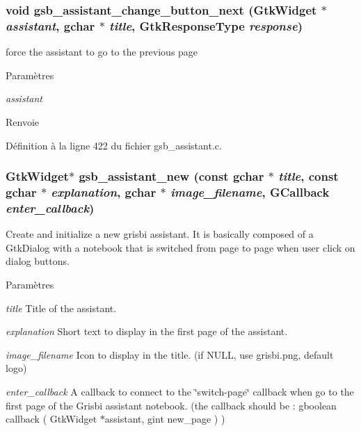 \subsubsection[{gsb\_\-assistant\_\-change\_\-button\_\-next}]{\setlength{\rightskip}{0pt plus 5cm}void gsb\_\-assistant\_\-change\_\-button\_\-next (GtkWidget $\ast$ {\em assistant}, \/  gchar $\ast$ {\em title}, \/  GtkResponseType {\em response})}\label{gsb__assistant_8c_af9667499ec49ad50593c8662801d4a9c}
force the assistant to go to the previous page


\begin{DoxyParams}{Paramètres}
\item[{\em assistant}]\end{DoxyParams}
\begin{DoxyReturn}{Renvoie}

\end{DoxyReturn}


Définition à la ligne 422 du fichier gsb\_\-assistant.c.

\subsubsection[{gsb\_\-assistant\_\-new}]{\setlength{\rightskip}{0pt plus 5cm}GtkWidget$\ast$ gsb\_\-assistant\_\-new (const gchar $\ast$ {\em title}, \/  const gchar $\ast$ {\em explanation}, \/  gchar $\ast$ {\em image\_\-filename}, \/  GCallback {\em enter\_\-callback})}\label{gsb__assistant_8c_a8502128771d8c3f3e8c83d877e1f20ea}
Create and initialize a new grisbi assistant. It is basically composed of a GtkDialog with a notebook that is switched from page to page when user click on dialog buttons.


\begin{DoxyParams}{Paramètres}
\item[{\em title}]Title of the assistant. \item[{\em explanation}]Short text to display in the first page of the assistant. \item[{\em image\_\-filename}]Icon to display in the title. (if NULL, use grisbi.png, default logo) \item[{\em enter\_\-callback}]A callback to connect to the \char`\"{}switch-\/page\char`\"{} callback when go to the first page of the Grisbi assistant notebook. (the callback should be : gboolean callback ( GtkWidget $\ast$assistant, gint new\_\-page ) ) \end{DoxyParams}


